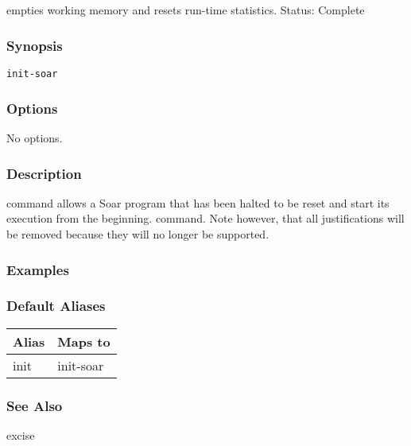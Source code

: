 \subsection{}
\label{init-soar}
empties working memory and resets run-time statistics. 
 Status: Complete
\subsubsection*{Synopsis}
\begin{verbatim}
init-soar
\end{verbatim}
\subsubsection*{Options}
 No options. 
\subsubsection*{Description}
 command allows a Soar program that has been halted to be reset and start its execution from the beginning. 
 command. Note however, that all justifications will be removed because they will no longer be supported. 
\subsubsection*{Examples}
\subsubsection*{Default Aliases}
\begin{tabular}{|l|l|}
\hline 
 Alias  & Maps to  \\
 \hline 
 init  & init-soar  \\
 \hline 
\end{tabular}
\subsubsection*{See Also}
 excise
